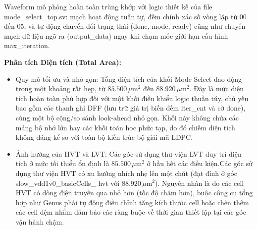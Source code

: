 \documentclass[12pt,a4paper,oneside]{book}
\begin{document}
Waveform mô phỏng hoàn toàn trùng khớp với logic thiết kế của file mode\_select\_top.sv: mạch hoạt động tuần tự, đếm chính xác số vòng lặp từ 00 đến 05, và tự động chuyển đổi trạng thái (done, mode, ready) cũng như chuyển mạch dữ liệu ngõ ra (output\_data) ngay khi chạm mốc giới hạn cấu hình max\_iteration.

\begin{table}[H]
\centering
{}
\caption{Tổng hợp thông số Diện tích và Công suất của khối Mode Select qua các process corners.}
\end{table}

\textbf{Phân tích Diện tích (Total Area):}
\begin{itemize}
    \item Quy mô tối ưu và nhỏ gọn: Tổng diện tích của khối Mode Select dao động trong một khoảng rất hẹp, từ $85.500\,\mu\text{m}^2$ đến $88.920\,\mu\text{m}^2$. Đây là mức diện tích hoàn toàn phù hợp đối với một khối điều khiển logic thuần túy, chủ yếu bao gồm các thanh ghi DFF (lưu trữ giá trị biến đếm iter\_cnt và cờ done), cùng một bộ cộng/so sánh look-ahead nhỏ gọn. Khối này không chứa các mảng bộ nhớ lớn hay các khối toán học phức tạp, do đó chiếm diện tích không đáng kể so với toàn bộ kiến trúc bộ giải mã LDPC.
    \item Ảnh hưởng của HVT và LVT: Các góc sử dụng thư viện LVT duy trì diện tích ở mức tối thiểu ổn định là $85.500\,\mu\text{m}^2$ ở hầu hết các điều kiện.Các góc sử dụng thư viện HVT có xu hướng nhích nhẹ lên một chút (đạt đỉnh ở góc slow\_vdd1v0\_basicCells\_ hvt với $88.920\,\mu\text{m}^2$). Nguyên nhân là do các cell HVT có dòng điện truyền qua nhỏ hơn (tốc độ chậm hơn), buộc công cụ tổng hợp như Genus phải tự động điều chỉnh tăng kích thước cell hoặc chèn thêm các cell đệm nhằm đảm bảo các ràng buộc về thời gian thiết lập tại các góc vận hành chậm.
\end{itemize}
\end{document}
